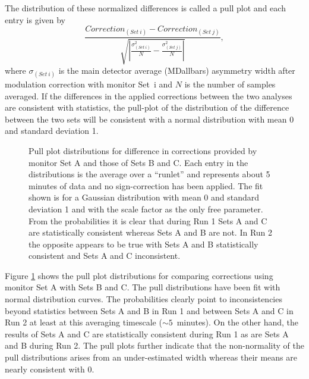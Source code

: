  The distribution of these normalized differences is called a pull plot and each entry is given by
\[
\frac{Correction_{(Set~i)}-Correction_{(Set~j)}}{\sqrt{\left|\frac{\sigma_{(Set~i)}^2}{N}-\frac{\sigma_{(Set~j)}^2}{N}\right|}},
\]
where $\sigma_{(Set~i)}$ is the main detector average (MDallbars) asymmetry width after modulation correction with monitor Set~i and $N$ is the number of samples averaged. If the differences in the applied corrections between the two analyses are consistent with statistics, the pull-plot of the distribution of the difference between the two sets will be consistent with a normal distribution with mean 0 and standard deviation 1.\begin{figure}[ht]

\centering
{}
\caption{Pull plot distributions for difference in corrections provided by monitor Set A and those of Sets B and C. Each entry in the distributions is the average over a ``runlet'' and represents about 5 minutes of data and no sign-correction has been applied. The fit shown is for a Gaussian distribution with mean 0 and standard deviation 1 and with the scale factor as the only free parameter. From the probabilities it is clear that during Run 1 Sets A and C are statistically consistent whereas Sets A and B are not. In Run 2 the opposite appears to be true with Sets A and B statistically consistent and Sets A and C inconsistent.}
\label{fig:runlet_pull_plots}
\end{figure}
 Figure \ref{fig:runlet_pull_plots} shows the pull plot distributions for comparing corrections using monitor Set A with Sets B and C. The pull distributions have been fit with normal distribution curves. The probabilities clearly point to inconsistencies beyond statistics between Sets A and B in Run 1 and between Sets A and C in Run 2 at least at this averaging timescale ($\sim 5$~minutes). On the other hand, the results of Sets A and C are statistically consistent during Run 1 as are Sets A and B during Run 2. The pull plots further indicate that the non-normality of the pull distributions arises from an under-estimated width whereas their means are nearly consistent with 0. 

